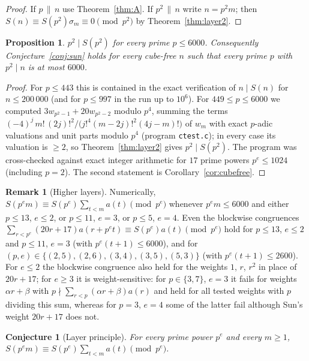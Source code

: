 \documentclass[11pt]{amsart}
\newtheorem{proposition}[theorem]{Proposition}
\newtheorem{conjecture}[theorem]{Conjecture}
\theoremstyle{definition}
\newtheorem{remark}[theorem]{Remark}
\begin{document}
\begin{proof}
If $p\,\|\,n$ use Theorem~\ref{thm:A}. If $p^2\,\|\,n$ write $n=p^2m$; then
$S(n)\equiv S(p^2)\sigma_m\equiv0\pmod{p^2}$ by Theorem~\ref{thm:layer2}.
\end{proof}

\begin{proposition}\label{prop:psq}
$p^2\mid S(p^2)$ for every prime $p\le 6000$. Consequently Conjecture~\ref{conj:sun} holds for every
cube-free $n$ such that every prime $p$ with $p^2\mid n$ is at most $6000$.
\end{proposition}

\begin{proof}
For $p\le 443$ this is contained in the exact verification of $n\mid S(n)$ for
$n\le200\,000$ (and for $p\le997$ in the run up to $10^6$). For $449\le p\le6000$ we computed $3w_{p^2-1}+20w_{p^2-2}$ modulo $p^4$, summing the terms
$(-4)^j\,m!\,(2j)!^2/\big(j!^4(m-2j)!^2(4j-m)!\big)$ of $w_m$ with exact $p$-adic valuations and unit
parts modulo $p^4$ (program \texttt{ctest.c}); in every case its valuation is $\ge2$, so
Theorem~\ref{thm:layer2} gives $p^2\mid S(p^2)$. The program was cross-checked against exact
integer arithmetic for $17$ prime powers $p^e\le1024$ (including $p=2$). The second statement is
Corollary~\ref{cor:cubefree}.
\end{proof}

\begin{remark}[Higher layers]\label{rem:layers}
Numerically, $S(p^em)\equiv S(p^e)\sum_{t<m}a(t)\pmod{p^e}$ whenever $p^em\le6000$ and
either $p\le13$, $e\le2$, or $p\le11$, $e=3$, or $p\le5$, $e=4$. Even the blockwise congruences
$\sum_{r<p^e}(20r+17)a(r+p^et)\equiv S(p^e)a(t)\pmod{p^e}$ hold for $p\le13$, $e\le2$ and $p\le11$,
$e=3$ (with $p^e(t+1)\le6000$), and for $(p,e)\in\{(2,5),(2,6),(3,4),(3,5),(5,3)\}$ (with
$p^e(t+1)\le2600$). For $e\le2$ the blockwise congruence also held for the weights $1$, $r$, $r^2$
in place of $20r+17$; for $e\ge3$ it is weight-sensitive: for $p\in\{3,7\}$, $e=3$ it fails for
weights $\alpha r+\beta$ with $p\nmid\sum_{r<p}(\alpha r+\beta)a(r)$ and held for all tested weights
with $p$ dividing this sum, whereas for $p=3$, $e=4$ some of the latter fail although Sun's weight
$20r+17$ does not.
\end{remark}

\begin{conjecture}[Layer principle]\label{conj:layer}
For every prime power $p^e$ and every $m\ge1$, $S(p^em)\equiv S(p^e)\sum_{t<m}a(t)\pmod{p^e}$.
\end{conjecture}
\end{document}
